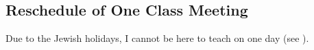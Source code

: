 \subsection*{Reschedule of One Class Meeting}

Due to the Jewish holidays, I cannot be here to teach on one day (see \coursewebpagelink).